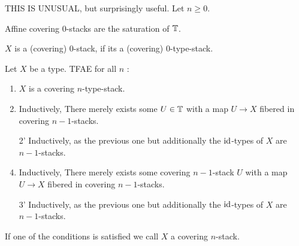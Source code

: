 \documentclass{article}
\begin{document}
THIS IS UNUSUAL, but surprisingly useful.
Let $n \ge 0$.
\begin{example}
	Affine covering $0$-stacks are the saturation of $\mathbb{T}$.
\end{example}
\begin{definition}
	$X$ is a (covering) 0-stack, if its a (covering) 0-type-stack.
\end{definition}
\begin{theorem}[TODO]
	Let $X$ be a type. TFAE for all $n$ :
	\begin{enumerate}
		\item $X$ is a covering $n$-type-stack.

		\item Inductively, There merely exists some $U \in \mathbb{T}$ with a map $U \to X$ fibered in covering $n-1$-stacks.
		\item[2'] Inductively, as the previous one but additionally the $\operatorname{id}$-types of $X$ are $n-1$-stacks.
		\item Inductively, There merely exists some covering $n-1$-stack $U$ with a map $U \to X$ fibered in covering $n-1$-stacks.		
		\item[3'] Inductively, as the previous one but additionally the $\operatorname{id}$-types of $X$ are $n-1$-stacks.
	\end{enumerate}
If one of the conditions is satisfied we call $X$ a covering $n$-stack.
\end{theorem}
\end{document}

